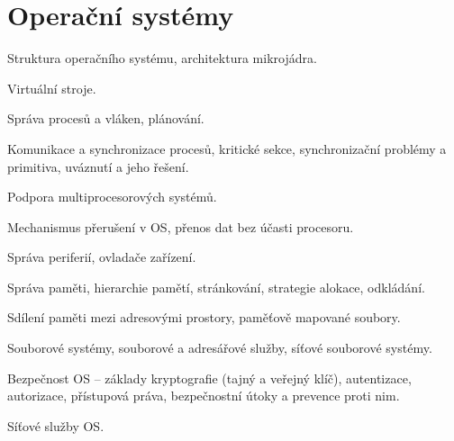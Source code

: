 \newpage
\section{Operační systémy}
\begin{pozadavky}
\begin{pitemize}
\item Struktura operačního systému, architektura mikrojádra.
\item Virtuální stroje.
\item Správa procesů a vláken, plánování.
\item Komunikace a synchronizace procesů, kritické sekce, synchronizační problémy a primitiva, uváznutí a jeho řešení.
\item Podpora multiprocesorových systémů.
\item Mechanismus přerušení v OS, přenos dat bez účasti procesoru.
\item Správa periferií, ovladače zařízení.
\item Správa paměti, hierarchie pamětí, stránkování, strategie alokace, odkládání.
\item Sdílení paměti mezi adresovými prostory, paměťově mapované soubory.
\item Souborové systémy, souborové a adresářové služby, síťové souborové systémy.
\item Bezpečnost OS – základy kryptografie (tajný a veřejný klíč), autentizace, autorizace, přístupová práva, bezpečnostní útoky a prevence proti nim.
\item Síťové služby OS.
\end{pitemize}
\end{pozadavky}